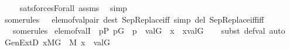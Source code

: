 \begin{isabellebody}
%
\isadelimproof
\ \ \ %
\endisadelimproof
%
\isatagproof
{}\isamarkupfalse%
\ sats{\isacharunderscore}{\kern0pt}forces{\isacharunderscore}{\kern0pt}Forall{\isacharprime}{\kern0pt}\ assms\ \isamarkupfalse%
\ simp%
\endisatagproof
{\isafoldproof}%
%
\isadelimproof
\isanewline
%
\endisadelimproof
\isanewline
\isanewline
{}\isamarkupfalse%
\ some{\isacharunderscore}{\kern0pt}rules\ {\isacharequal}{\kern0pt}\ \ elem{\isacharunderscore}{\kern0pt}of{\isacharunderscore}{\kern0pt}val{\isacharunderscore}{\kern0pt}pair\ {\isacharbrackleft}{\kern0pt}dest{\isacharbrackright}{\kern0pt}\ SepReplace{\isacharunderscore}{\kern0pt}iff\ {\isacharbrackleft}{\kern0pt}simp\ del{\isacharbrackright}{\kern0pt}\ SepReplace{\isacharunderscore}{\kern0pt}iff{\isacharbrackleft}{\kern0pt}iff{\isacharbrackright}{\kern0pt}\isanewline
\isanewline
{}\isamarkupfalse%
\ \isanewline
\ \ \ some{\isacharunderscore}{\kern0pt}rules\isanewline
{}\isanewline
\isanewline
{}\isamarkupfalse%
\ elem{\isacharunderscore}{\kern0pt}of{\isacharunderscore}{\kern0pt}valI{\isacharcolon}{\kern0pt}\ {\isachardoublequoteopen}{\isasymexists}{\isasymtheta}{\isachardot}{\kern0pt}\ {\isasymexists}p{\isasymin}P{\isachardot}{\kern0pt}\ p{\isasymin}G\ {\isasymand}\ {\isasymlangle}{\isasymtheta}{\isacharcomma}{\kern0pt}p{\isasymrangle}{\isasymin}{\isasympi}\ {\isasymand}\ val{\isacharparenleft}{\kern0pt}G{\isacharcomma}{\kern0pt}{\isasymtheta}{\isacharparenright}{\kern0pt}\ {\isacharequal}{\kern0pt}\ x\ {\isasymLongrightarrow}\ x{\isasymin}val{\isacharparenleft}{\kern0pt}G{\isacharcomma}{\kern0pt}{\isasympi}{\isacharparenright}{\kern0pt}{\isachardoublequoteclose}\isanewline
%
\isadelimproof
\ \ %
\endisadelimproof
%
\isatagproof
{}\isamarkupfalse%
\ {\isacharparenleft}{\kern0pt}subst\ def{\isacharunderscore}{\kern0pt}val{\isacharcomma}{\kern0pt}\ auto{\isacharparenright}{\kern0pt}%
\endisatagproof
{\isafoldproof}%
%
\isadelimproof
\isanewline
%
\endisadelimproof
\isanewline
{}\isamarkupfalse%
\ GenExtD{\isacharcolon}{\kern0pt}\ {\isachardoublequoteopen}x{\isasymin}M{\isacharbrackleft}{\kern0pt}G{\isacharbrackright}{\kern0pt}\ {\isasymlongleftrightarrow}\ {\isacharparenleft}{\kern0pt}{\isasymexists}{\isasymtau}{\isasymin}M{\isachardot}{\kern0pt}\ x\ {\isacharequal}{\kern0pt}\ val{\isacharparenleft}{\kern0pt}G{\isacharcomma}{\kern0pt}{\isasymtau}{\isacharparenright}{\kern0pt}{\isacharparenright}{\kern0pt}{\isachardoublequoteclose}\isanewline
%
\isadelimproof
\ \ %
\endisadelimproof

\end{isabellebody}
